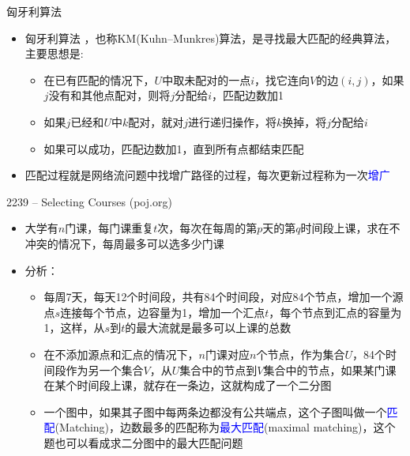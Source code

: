 \begin{frame}{匈牙利算法}
    \begin{itemize}
        \item 匈牙利算法 ，也称KM(Kuhn–Munkres)算法，是寻找最大匹配的经典算法， 主要思想是:
        \begin{itemize}
            \item 在已有匹配的情况下，$U$中取未配对的一点$i$，找它连向$V$的边$(i,j)$，如果$j$没有和其他点配对，则将$j$分配给$i$，匹配边数加1
            \item 如果$j$已经和$U$中$k$配对，就对$j$进行递归操作，将$k$换掉，将$j$分配给$i$
            \item 如果可以成功，匹配边数加1，直到所有点都结束匹配
        \end{itemize}
        \vfill
        \item 匹配过程就是网络流问题中找增广路径的过程，每次更新过程称为一次\textcolor{blue}{增广}
    \end{itemize}
\end{frame}
\begin{frame}{2239 -- Selecting Courses (poj.org)}
    \begin{itemize}
        \item 大学有$n$门课，每门课重复$t$次，每次在每周的第$p$天的第$q$时间段上课，求在不冲突的情况下，每周最多可以选多少门课
        \item 分析：
        \begin{itemize}
            \item 每周7天，每天12个时间段，共有84个时间段，对应84个节点，增加一个源点$s$连接每个节点，边容量为1，增加一个汇点$t$，每个节点到汇点的容量为1，这样，从$s$到$t$的最大流就是最多可以上课的总数
            \item 在不添加源点和汇点的情况下，$n$门课对应$n$个节点，作为集合$U$，84个时间段作为另一个集合$V$，从$U$集合中的节点到$V$集合中的节点，如果某门课在某个时间段上课，就存在一条边，这就构成了一个二分图
            \item 一个图中，如果其子图中每两条边都没有公共端点，这个子图叫做一个\textcolor{blue}{匹配}(Matching)，边数最多的匹配称为\textcolor{blue}{最大匹配}(maximal matching)，这个题也可以看成求二分图中的最大匹配问题
        \end{itemize}
    \end{itemize}
\end{frame}
